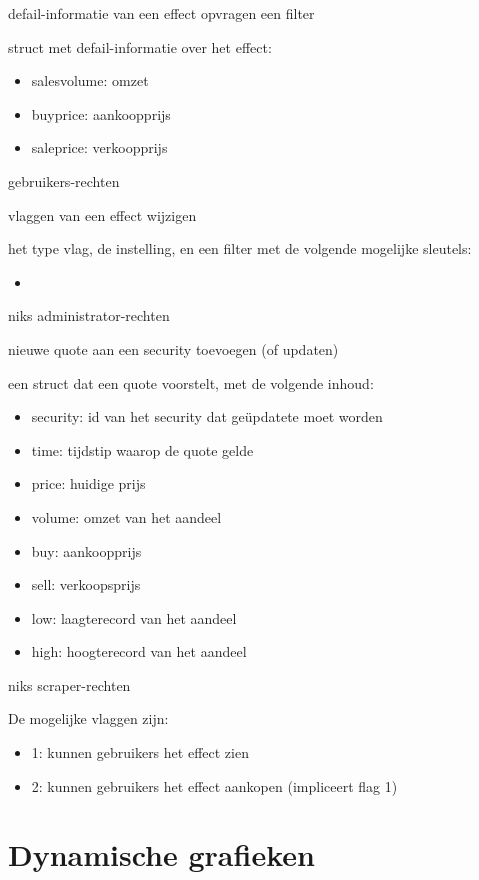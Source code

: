 	{ defail-informatie van een effect opvragen }
	{ een filter }
	{ struct met defail-informatie over het effect:
		\begin{itemize}
		\item{salesvolume: omzet}
		\item{buyprice: aankoopprijs}
		\item{saleprice: verkoopprijs}
		\end{itemize} }
	{ gebruikers-rechten }

	{ vlaggen van een effect wijzigen }
	{ het type vlag, de instelling, en een filter met de volgende mogelijke sleutels:
		\begin{itemize}
		\item{}
		\end{itemize} }
	{ niks }
	{ administrator-rechten }

	{ nieuwe quote aan een security toevoegen (of updaten) }
	{ een struct dat een quote voorstelt, met de volgende inhoud:
		\begin{itemize}
		\item{security: id van het security dat ge\"updatete moet worden}
		\item{time: tijdstip waarop de quote gelde}
		\item{price: huidige prijs}
		\item{volume: omzet van het aandeel}
		\item{buy: aankoopprijs}
		\item{sell: verkoopsprijs}
		\item{low: laagterecord van het aandeel}
		\item{high: hoogterecord van het aandeel}
		\end{itemize} }
	{ niks }
	{ scraper-rechten }

De mogelijke vlaggen zijn:
\begin{itemize}
\item{1: kunnen gebruikers het effect zien}
\item{2: kunnen gebruikers het effect aankopen (impliceert flag 1)}
\end{itemize}


%
%


\chapter{Dynamische grafieken}

